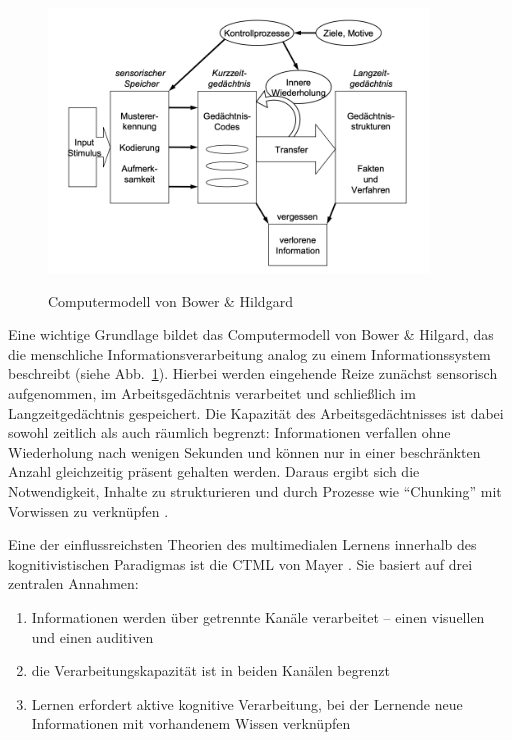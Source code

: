 \begin{figure}[htbp]
    \centering
    \includegraphics[width=0.90\textwidth]{img/Computermodell.png}
    \caption{Computermodell von Bower \& Hildgard }
	\parencite[S.~234]{bower_theorie_1984}
    \label{fig:computermodell}
\end{figure}

Eine wichtige Grundlage bildet das Computermodell von Bower \& Hilgard, das die menschliche Informationsverarbeitung analog zu einem Informationssystem beschreibt (siehe Abb.~\ref{fig:computermodell}). Hierbei werden eingehende Reize zunächst sensorisch aufgenommen, im Arbeitsgedächtnis verarbeitet und schließlich im Langzeitgedächtnis gespeichert. Die Kapazität des Arbeitsgedächtnisses ist dabei sowohl zeitlich als auch räumlich begrenzt: Informationen verfallen ohne Wiederholung nach wenigen Sekunden und können nur in einer beschränkten Anzahl gleichzeitig präsent gehalten werden. Daraus ergibt sich die Notwendigkeit, Inhalte zu strukturieren und durch Prozesse wie \enquote{Chunking} mit Vorwissen zu verknüpfen \parencite[S.~15]{pfeiffer_simulationsumgebungen_2008}.

Eine der einflussreichsten Theorien des multimedialen Lernens innerhalb des kognitivistischen Paradigmas ist die \ac{CTML} von Mayer \parencite[S.~102--105]{mayer_multimedia_2001}. Sie basiert auf drei zentralen Annahmen:
\begin{enumerate}
	\item Informationen werden über getrennte Kanäle verarbeitet – einen visuellen und einen auditiven
	\item die Verarbeitungskapazität ist in beiden Kanälen begrenzt
	\item Lernen erfordert aktive kognitive Verarbeitung, bei der Lernende neue Informationen mit vorhandenem Wissen verknüpfen
\end{enumerate}

